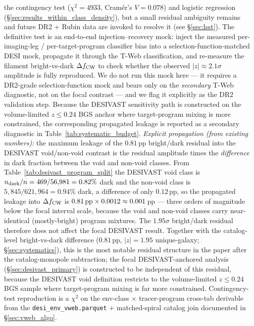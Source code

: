 \documentclass[aps,prd,twocolumn,superscriptaddress,showpacs,preprintnumbers,nofootinbib,longbibliography,floatfix]{revtex4-2}
\begin{document}
the contingency test ($\chi^2\!=\!4933$, Cram\'{e}r's $V\!=\!0.078$)
and logistic regression (\S\ref{sec:results_within_class_density}),
but a small residual ambiguity remains and future DR2 + Rubin data
are invoked to resolve it (see \S\ref{sec:lsst}). The definitive test
is an end-to-end injection--recovery mock: inject the measured
per-imaging-leg / per-target-program classifier bias into a
selection-function-matched DESI mock, propagate it through the
T-Web classification, and re-measure the filament bright-vs-dark
$\Delta f_{\rm CW}$ to check whether the observed
$|z|\!\approx\!2.1\sigma$ amplitude is fully reproduced. We do not run
this mock here --- it requires a DR2-grade selection-function mock and
bears only on the \emph{secondary} T-Web diagnostic, not on the focal contrast
--- and we flag it explicitly as the DR2 validation step. Because the
DESIVAST sensitivity path is constructed on the volume-limited $z\!\le\!0.24$
BGS anchor where target-program mixing is more constrained, the
corresponding propagated leakage is reported as a secondary diagnostic
in Table~\ref{tab:systematic_budget}.
\emph{Explicit propagation (from existing numbers):} the maximum leakage
of the $0.81$\,pp bright/dark residual into the DESIVAST void/non-void
contrast is the residual amplitude times the \emph{difference} in dark
fraction between the void and non-void classes. From
Table~\ref{tab:desivast_program_split} the DESIVAST void class is
$n_{\rm dark}/n = 469/56{,}981 = 0.82\%$ dark and the non-void class is
$5{,}845/621{,}964 = 0.94\%$ dark, a difference of only $0.12$\,pp, so the
propagated leakage into $\Delta f_{\rm CW}$ is
$0.81\,{\rm pp}\times 0.0012 \approx 0.001$\,pp --- three orders of
magnitude below the focal interval scale, because the void and non-void classes
carry near-identical (mostly-bright) program mixtures. The $1.95\sigma$
bright/dark residual therefore does not affect the focal DESIVAST
result.
Together with the catalog-level bright-vs-dark difference
($0.81$\,pp, $|z| = 1.95$ unique-galaxy; \S\ref{sec:systematics}), this is the
most notable residual structure in the paper after
the catalog-monopole subtraction; the focal DESIVAST-anchored
analysis (\S\ref{sec:desivast_primary}) is constructed to be
independent of this residual, because the DESIVAST void definition
restricts to the volume-limited $z \leq 0.24$ BGS sample where
target-program mixing is far more constrained. Contingency-test reproduction is a $\chi^{2}$ on the env-class
$\times$ tracer-program cross-tab derivable from the
\texttt{desi\_env\_vweb.parquet} + matched-spiral catalog join
documented in \S\ref{sec:vweb_algo}.
\end{document}

